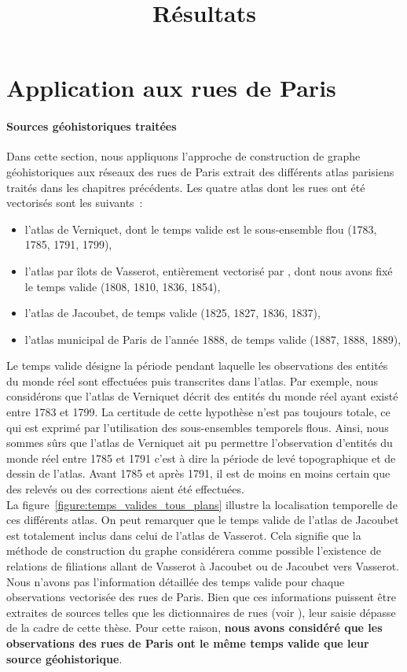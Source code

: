 \documentclass[a4paper,12pt]{article}
\title{Résultats}
\begin{document}
\maketitle

\section{Application aux rues de Paris}
\paragraph{Sources géohistoriques traitées}
Dans cette section, nous appliquons l'approche de construction de graphe géohistoriques aux réseaux des rues de Paris extrait des différents atlas parisiens traités dans les chapitres précédents. Les quatre atlas dont les rues ont été vectorisés sont les suivants~:
\begin{itemize}
\item l'atlas de Verniquet, dont le temps valide est le sous-ensemble flou (1783, 1785, 1791, 1799),
\item l'atlas par îlots de Vasserot, entièrement vectorisé par \cite{ALPAGE}, dont nous avons fixé le temps valide (1808, 1810, 1836, 1854),
\item l'atlas de Jacoubet, de temps valide (1825, 1827, 1836, 1837),
\item l'atlas municipal de Paris de l'année 1888, de temps valide (1887, 1888, 1889),
\end{itemize}
Le temps valide désigne la période pendant laquelle les observations des entités du monde réel sont effectuées puis transcrites dans l'atlas. Par exemple, nous considérons que l'atlas de Verniquet décrit des entités du monde réel ayant existé entre 1783 et 1799. La certitude de cette hypothèse n'est pas toujours totale, ce qui est exprimé par l'utilisation des sous-ensembles temporels flous. Ainsi, nous sommes sûrs que l'atlas de Verniquet ait pu permettre l'observation d'entités du monde réel entre 1785 et 1791 c'est à dire la période de levé topographique et de dessin de l'atlas. Avant 1785 et après 1791, il est de moins en moins certain que des relevés ou des corrections aient été effectuées.
\\
La figure~\ref{figure:temps_valides_tous_plans} illustre la localisation temporelle de ces différents atlas. On peut remarquer que le temps valide de l'atlas de Jacoubet est totalement inclus dans celui de l'atlas de Vasserot. Cela signifie que la méthode de construction du graphe considérera comme possible l'existence de relations de filiations allant de Vasserot à Jacoubet ou de Jacoubet vers Vasserot.
\\
Nous n'avons pas l'information détaillée des temps valide pour chaque observations vectorisée des rues de Paris. Bien que ces informations puissent être extraites de sources telles que les dictionnaires de rues (voir \citep{Lazare1844, Lazare1855}), leur saisie dépasse de la cadre de cette thèse. Pour cette raison, \textbf{nous avons considéré que les observations des rues de Paris ont le même temps valide que leur source géohistorique}.
\end{document}
